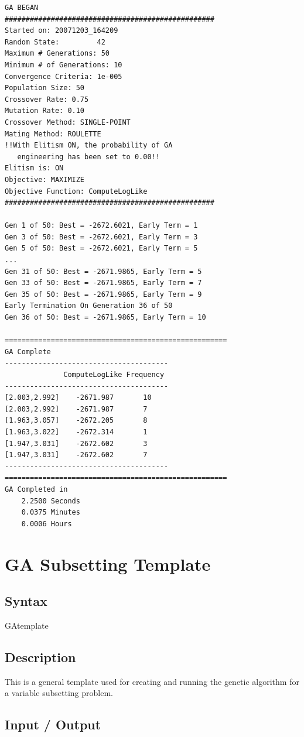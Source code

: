 \documentclass{book}
\newcommand{\textcode}[1]{\textsf{\small #1}}   %
\begin{document}
\begin{verbatim}
GA BEGAN
##################################################
Started on: 20071203_164209
Random State:         42
Maximum # Generations: 50
Minimum # of Generations: 10
Convergence Criteria: 1e-005
Population Size: 50
Crossover Rate: 0.75
Mutation Rate: 0.10
Crossover Method: SINGLE-POINT
Mating Method: ROULETTE
!!With Elitism ON, the probability of GA
   engineering has been set to 0.00!!
Elitism is: ON
Objective: MAXIMIZE
Objective Function: ComputeLogLike
##################################################

Gen 1 of 50: Best = -2672.6021, Early Term = 1
Gen 3 of 50: Best = -2672.6021, Early Term = 3
Gen 5 of 50: Best = -2672.6021, Early Term = 5
...
Gen 31 of 50: Best = -2671.9865, Early Term = 5
Gen 33 of 50: Best = -2671.9865, Early Term = 7
Gen 35 of 50: Best = -2671.9865, Early Term = 9
Early Termination On Generation 36 of 50
Gen 36 of 50: Best = -2671.9865, Early Term = 10

=====================================================
GA Complete
---------------------------------------
              ComputeLogLike Frequency
---------------------------------------
[2.003,2.992]    -2671.987       10
[2.003,2.992]    -2671.987       7
[1.963,3.057]    -2672.205       8
[1.963,3.022]    -2672.314       1
[1.947,3.031]    -2672.602       3
[1.947,3.031]    -2672.602       7
---------------------------------------
=====================================================
GA Completed in
    2.2500 Seconds
    0.0375 Minutes
    0.0006 Hours
\end{verbatim}

\section{GA Subsetting Template}

\subsection*{Syntax}

\textcode{GAtemplate}

\subsection*{Description}

This is a general template used for creating and running the genetic
algorithm for a variable subsetting problem.

\subsection*{Input / Output}
\end{document}
